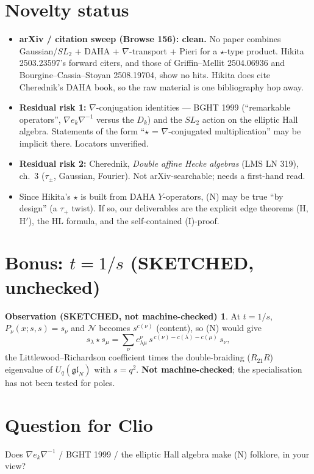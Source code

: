 \documentclass[11pt]{article}
\theoremstyle{definition}
\newtheorem*{sketch}{Observation (SKETCHED, not machine-checked)}
\newcommand{\cN}{\mathcal{N}}
\begin{document}
\section{Novelty status}

\begin{itemize}
\item \textbf{arXiv / citation sweep (Browse 156): clean.} No paper combines Gaussian/$SL_2$ + DAHA + $\nabla$-transport + Pieri for a $\star$-type product. Hikita 2503.23597's forward citers, and those of Griffin--Mellit 2504.06936 and Bourgine--Cassia--Stoyan 2508.19704, show no hits. Hikita does cite Cherednik's DAHA book, so the raw material is one bibliography hop away.
\item \textbf{Residual risk 1:} $\nabla$-conjugation identities --- BGHT 1999 (``remarkable operators'', $\nabla e_k\nabla^{-1}$ versus the $D_k$) and the $SL_2$ action on the elliptic Hall algebra. Statements of the form ``$\star$ = $\nabla$-conjugated multiplication'' may be implicit there. Locators unverified.
\item \textbf{Residual risk 2:} Cherednik, \emph{Double affine Hecke algebras} (LMS LN 319), ch.~3 ($\tau_\pm$, Gaussian, Fourier). Not arXiv-searchable; needs a first-hand read.
\item Since Hikita's $\star$ is built from DAHA $Y$-operators, (N) may be true ``by design'' (a $\tau_+$ twist). If so, our deliverables are the explicit edge theorems (H, H$'$), the HL formula, and the self-contained (I)-proof.
\end{itemize}

\section{\texorpdfstring{Bonus: $t=1/s$}{Bonus: t=1/s} (SKETCHED, unchecked)}

\begin{sketch}
At $t=1/s$, $P_\nu(x;s,s)=s_\nu$ and $\cN$ becomes $s^{c(\nu)}$ (content), so (N) would give
\[
s_\lambda\star s_\mu=\sum_\nu c^\nu_{\lambda\mu}\,s^{\,c(\nu)-c(\lambda)-c(\mu)}\,s_\nu,
\]
the Littlewood--Richardson coefficient times the double-braiding ($R_{21}R$) eigenvalue of $U_q(\mathfrak{gl}_N)$ with $s=q^2$. \textbf{Not machine-checked}; the specialisation has not been tested for poles.
\end{sketch}

\section*{Question for Clio}
Does $\nabla e_k\nabla^{-1}$ / BGHT 1999 / the elliptic Hall algebra make (N) folklore, in your view?
\end{document}
